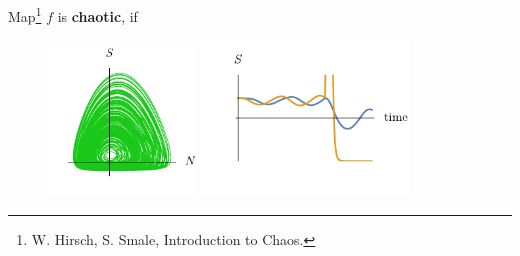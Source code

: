 
  Map\footnote{
    W. Hirsch, S. Smale, Introduction to Chaos.
} $f$ is \textbf{chaotic}, if \\
\begin{itemize}
\end{itemize}

\vspace{-5mm}
\begin{figure}[h]
    \centering
    \includegraphics[width=0.35\textwidth]{figures/attractor.pdf}
    \hspace{5 mm}
    \includegraphics[width=0.49\textwidth]{figures/ics.pdf}
\end{figure}


